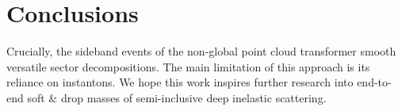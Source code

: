 \section{Conclusions}\label{sec:conclusions}

Crucially, the sideband events of the non-global point cloud transformer
smooth versatile sector decompositions. The main limitation of this
approach is its reliance on instantons. We hope this work inspires
further research into end-to-end soft & drop masses of semi-inclusive deep
inelastic scattering.

